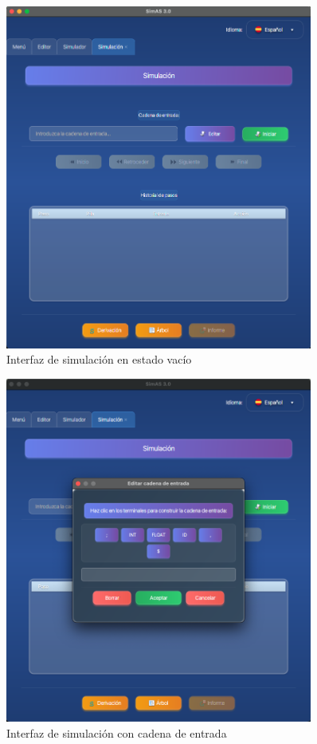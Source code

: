 \needspace{8cm}
\begin{figure}[H]
    \centering
    \includegraphics[width=0.9\textwidth]{figuras/simulador/simulacion_vacia.png}
    \caption{Interfaz de simulación en estado vacío}
    \label{fig:simulacion_vacia}
\end{figure}

\needspace{8cm}
\begin{figure}[H]
    \centering
    \includegraphics[width=0.9\textwidth]{figuras/simulador/simulacion_cadenaEntrada.png}
    \caption{Interfaz de simulación con cadena de entrada}
    \label{fig:simulacion_cadena_entrada}
\end{figure}


